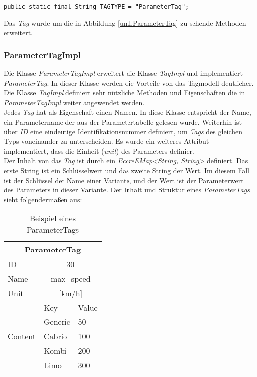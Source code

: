 \begin{lstlisting}
public static final String TAGTYPE = "ParameterTag";
\end{lstlisting}

Das \textit{Tag} wurde um die in Abbildung \ref{uml.ParameterTag} zu sehende Methoden erweitert. 

\subsubsection{ParameterTagImpl}
Die Klasse \textit{ParameterTagImpl} erweitert die Klasse \textit{TagImpl} und implementiert \textit{ParameterTag}. In dieser Klasse werden die Vorteile von das Tagmodell deutlicher. Die Klasse \textit{TagImpl} definiert sehr nützliche Methoden und Eigenschaften die in \textit{ParameterTagImpl} weiter angewendet werden.\\

Jedes \textit{Tag} hat als Eigenschaft einen Namen. In diese Klasse entspricht der Name, ein Parametername der aus der Parametertabelle gelesen wurde. Weiterhin ist über \textit{ID} eine eindeutige Identifikationsnummer definiert, um \textit{Tags} des gleichen Typs voneinander zu unterscheiden. Es wurde ein weiteres Attribut implementiert, dass die Einheit (\textit{unit}) des Parameters definiert\\

Der Inhalt von das \textit{Tag} ist durch ein \textit{EcoreEMap<String, String>} definiert. Das erste String ist ein Schlüsselwert und das zweite String der Wert. Im diesem Fall ist der Schlüssel der Name einer Variante, und der Wert ist der Parameterwert des Parameters in dieser Variante. Der Inhalt und Struktur eines \textit{ParameterTags} sieht folgendermaßen aus:\\

\begin{table}[h]
\begin{center}
	\begin{tabular}{|l||ll|}
	 \hline
	 \multicolumn{3}{|c|}{ParameterTag}\\
	 \hline\hline
	 ID			& \multicolumn{2}{|c|}{30}\\
	 \hline
	 Name		& \multicolumn{2}{|c|}{max\_speed}\\
	 \hline
	 Unit		& \multicolumn{2}{|c|}{[km/h]}\\
	 \hline
	 \multirow{5}{*}{Content}	&Key			&Value\\ \cline{2-3}
	 							&Generic		&50\\
	 							&Cabrio		&100\\
	 							&Kombi		&200\\
	 							&Limo		&300\\
	 \hline
	\end{tabular}
	
	\caption{Beispiel eines ParameterTags}
	\label{table:ParameterTagStruktur}
\end{center}
\end{table}


